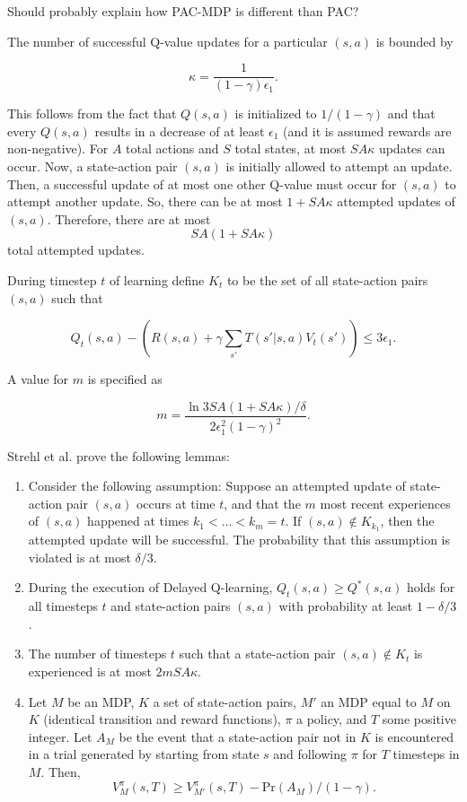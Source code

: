 \documentclass[10pt]{article}
\begin{document}
Should probably explain how PAC-MDP is different than PAC?


The number of successful Q-value updates for a particular $(s,a)$ is bounded by

$$\kappa = \frac{1}{(1-\gamma)\epsilon_1}.$$

This follows from the fact that $Q(s,a)$ is initialized to $1/(1-\gamma)$ and that every $Q(s,a)$ results in a decrease of at least $\epsilon_1$ (and it is assumed rewards are non-negative).  For $A$ total actions and $S$ total states, at most $SA\kappa$ updates can occur.  Now, a state-action pair $(s,a)$ is initially allowed to attempt an update.  Then, a successful update of at most one other Q-value must occur  for $(s,a)$ to attempt another update.  So, there can be at most $1+SA\kappa$ attempted updates of $(s,a)$.  Therefore, there are at most
$$SA(1+SA\kappa)$$
total attempted updates.

During timestep $t$ of learning define $K_t$ to be the set of all state-action pairs $(s,a)$ such that 

$$Q_t(s,a) - \left(R(s,a)+\gamma\sum_{s'}T(s'|s,a)V_t(s')\right) \leq 3\epsilon_1.$$

A value for $m$ is specified as 

$$m=\frac{\ln{3SA(1+SA\kappa)/\delta}}{2\epsilon_1^2(1-\gamma)^2}.$$

Strehl et al. prove the following lemmas:

\begin{enumerate}

\item Consider the following assumption:  Suppose an attempted update of state-action pair $(s,a)$ occurs at time $t$, and that the $m$ most recent experiences of $(s,a)$ happened at times $k_1 < \dots < k_m = t$.  If $(s,a) \notin K_{k_1}$, then the attempted update will be successful.  The probability that this assumption is violated is at most $\delta/3$.  


\item During the execution of Delayed Q-learning, $Q_t(s,a) \geq Q^*(s,a)$ holds for all timesteps $t$ and state-action pairs $(s,a)$ with probability at least $1-\delta/3$.

\item The number of timesteps $t$ such that a state-action pair $(s,a) \notin K_t$ is experienced is at most $2mSA\kappa$.

\item Let $M$ be an MDP, $K$ a set of state-action pairs, $M'$ an MDP equal to $M$ on $K$ (identical transition and reward functions), $\pi$ a policy, and
$T$ some positive integer. Let $A_M$ be the event that a state-action pair not in $K$ is encountered in a trial generated by starting from state $s$ and following $\pi$ for $T$ timesteps in $M$. Then,
$$V_M^\pi(s,T)\geq V_{M'}^{\pi}(s,T)-\text{Pr}(A_M)/(1-\gamma).$$

\end{enumerate}
\end{document}
